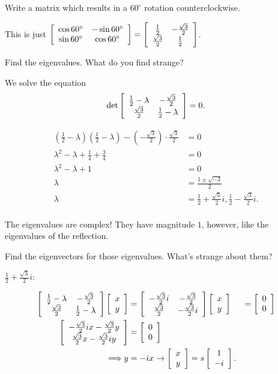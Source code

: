 \documentclass[../key.tex]{subfiles}
\begin{document}
\begin{outer_problem}
\item
\end{outer_problem}

\begin{inner_problem}[start=1]
\item Write a matrix which results in a $60^\circ$ rotation counterclockwise.
\end{inner_problem}

This is just $\left[\begin{array}{cc} \cos 60^\circ & -\sin 60^\circ \\ \sin 60^\circ & \cos 60^\circ \end{array}\right]=\left[\begin{array}{cc} \frac{1}{2} & -\frac{\sqrt{3}}{2} \\ \frac{\sqrt{3}}{2} & \frac{1}{2} \end{array}\right]$.

\begin{inner_problem}
\item Find the eigenvalues. What do you find strange?
\end{inner_problem}

We solve the equation $$\det \left[\begin{array}{cc} \frac{1}{2} - \lambda & -\frac{\sqrt{3}}{2} \\ \frac{\sqrt{3}}{2} & \frac{1}{2} - \lambda \end{array}\right] = 0.$$

\begin{align*}
\left(\frac{1}{2} - \lambda\right)\left(\frac{1}{2} - \lambda\right)-\left(-\frac{\sqrt{3}}{2}\right)\cdot \frac{\sqrt{3}}{2} &= 0 \\
\lambda^2 - \lambda + \frac{1}{4} + \frac{3}{4} &= 0 \\
\lambda^2 - \lambda + 1 &= 0 \\
\lambda &= \frac{1\pm\sqrt{-3}}{2} \\
\lambda &= \frac{1}{2} + \frac{\sqrt{3}}{2}i, \frac{1}{2} - \frac{\sqrt{3}}{2}i.\\
\end{align*}

The eigenvalues are complex! They have magnitude $1$, however, like the eigenvalues of the reflection.

\begin{inner_problem}
\item Find the eigenvectors for those eigenvalues. What's strange about them?
\end{inner_problem}

$\frac{1}{2} + \frac{\sqrt{3}}{2}i:$

\begin{align*}
\left[\begin{array}{cc} \frac{1}{2} - \lambda & -\frac{\sqrt{3}}{2} \\ \frac{\sqrt{3}}{2} & \frac{1}{2} - \lambda \end{array}\right]\left[\begin{array}{c} x \\ y \end{array}\right] &= \left[\begin{array}{cc} -\frac{\sqrt{3}}{2}i & -\frac{\sqrt{3}}{2} \\ \frac{\sqrt{3}}{2} & -\frac{\sqrt{3}}{2}i \end{array}\right]\left[\begin{array}{c} x \\ y \end{array}\right] &= \left[\begin{array}{c} 0 \\ 0 \end{array}\right] \\
\left[\begin{array}{c} -\frac{\sqrt{3}}{2}ix-\frac{\sqrt{3}}{2}y \\ \frac{\sqrt{3}}{2}x-\frac{\sqrt{3}}{2}iy \end{array}\right] &= \left[\begin{array}{c} 0 \\ 0 \end{array}\right] \\
\Longrightarrow y &= -ix \rightarrow \left[\begin{array}{c} x \\ y \end{array}\right] = s\left[\begin{array}{c} 1 \\ -i \end{array}\right].
\end{align*}
\end{document}

